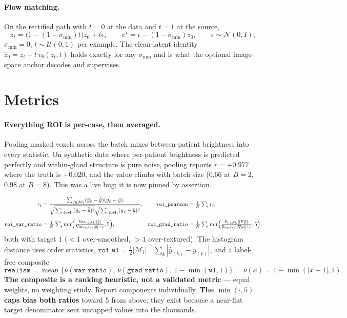 \documentclass[11pt]{article}
\newcommand{\yhat}{\hat{y}}
\newcommand{\roi}{\mathcal{M}}
\newcommand{\Var}{\operatorname{Var}}
\newcommand{\Ex}{\mathbb{E}}
\newcommand{\1}{\mathbb{1}}
\newcommand{\flag}[1]{\textcolor{red!60!black}{\textbf{#1}}}
\begin{document}
\paragraph{Flow matching.} On the rectified path with $t{=}0$ at the data and $t{=}1$ at the
source,
\begin{equation}
z_t=\bigl(1-(1-\sigma_{\min})t\bigr)z_0+t\epsilon,\qquad
v^\star=\epsilon-(1-\sigma_{\min})z_0,\qquad \epsilon\sim\mathcal{N}(0,I),
\end{equation}
$\sigma_{\min}=0$, $t\sim\mathcal{U}(0,1)$ per example. The clean-latent identity
$\hat z_0=z_t-t\,v_\theta(z_t,t)$ holds exactly for any $\sigma_{\min}$ and is what the
optional image-space anchor decodes and supervises.

\section{Metrics}

\paragraph{Everything ROI is per-case, then averaged.} Pooling masked voxels across the
batch mixes between-patient brightness into every statistic. On synthetic data where
per-patient brightness is predicted perfectly and within-gland structure is pure noise,
pooling reports $r=+0.977$ where the truth is $+0.020$, and the value climbs with batch size
($0.66$ at $B{=}2$, $0.98$ at $B{=}8$). This was a live bug; it is now pinned by assertion.

\begin{align}
r_i&=\frac{\sum_{v\in\roi_i}(\yhat_v-\bar{\yhat})(y_v-\bar y)}
{\sqrt{\sum_{v\in\roi_i}(\yhat_v-\bar{\yhat})^2}\sqrt{\sum_{v\in\roi_i}(y_v-\bar y)^2}},
&\texttt{roi\_pearson}&=\tfrac1N\textstyle\sum_i r_i, \\[3pt]
\texttt{roi\_var\_ratio}&=\tfrac1N\textstyle\sum_i\min\!\Bigl(\tfrac{\Var_{v\in\roi_i}[\yhat]}{\Var_{v\in\roi_i}[y]+\varepsilon},5\Bigr),
&\texttt{roi\_grad\_ratio}&=\tfrac1N\textstyle\sum_i\min\!\Bigl(\tfrac{\Ex_{v\in\roi_i}\|\nabla\yhat\|}{\Ex_{v\in\roi_i}\|\nabla y\|+\varepsilon},5\Bigr),
\end{align}
both with target $1$ ($<1$ over-smoothed, $>1$ over-textured). The histogram distance uses
order statistics, $\texttt{roi\_w1}=\tfrac12|\roi_i|^{-1}\sum_k|\yhat_{(k)}-y_{(k)}|$, and a
label-free composite
\begin{equation}
\texttt{realism}=\operatorname{mean}\bigl\{\nu(\texttt{var\_ratio}),\,\nu(\texttt{grad\_ratio}),\,1-\min(\texttt{w1},1)\bigr\},
\quad \nu(x)=1-\min(|x-1|,1).
\end{equation}
\flag{The composite is a ranking heuristic, not a validated metric} --- equal weights, no
weighting study. Report components individually. \flag{The $\min(\cdot,5)$ caps bias both
ratios} toward 5 from above; they exist because a near-flat target denominator sent uncapped
values into the thousands.
\end{document}
